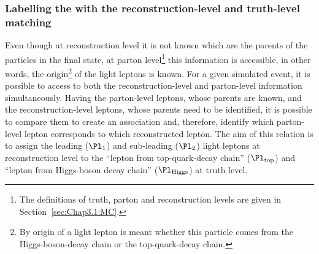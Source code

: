 \subsubsection{Labelling the \dilepSStau with the reconstruction-level and truth-level matching}
\label{sec:tHq:origin:LeptonAssignment_truth_reco_DeltaRCone}
Even though at reconstruction level it is not known which are the parents of the particles in the final
state, at parton level\footnote{The definitions of truth, parton and reconstruction levels are given in
Section~\ref{sec:Chap3.1:MC}.} this information is accessible, in other words, the origin\footnote{By origin of a 
light lepton is meant whether this particle comes from the Higgs-boson-decay chain or the top-quark-decay chain.}
 of the light leptons is known.
For a given simulated event, it is possible to access to both the reconstruction-level and parton-level information simultaneously.
Having the parton-level leptons, whose parents are known, and the reconstruction-level leptons, whose parents
need to be identified, it is possible to compare them to create an association and, therefore, identify which 
parton-level lepton corresponds to which reconstructed lepton.
The aim of this relation is to assign the leading ($\Pl_{1}$) and sub-leading ($\Pl_{2}$) light leptons at reconstruction level to
the ``lepton from top-quark-decay chain'' ($\Pl_{\text{top}}$) and ``lepton from Higgs-boson decay chain'' ($\Pl_{\text{Higgs}}$) 
at truth level. 

